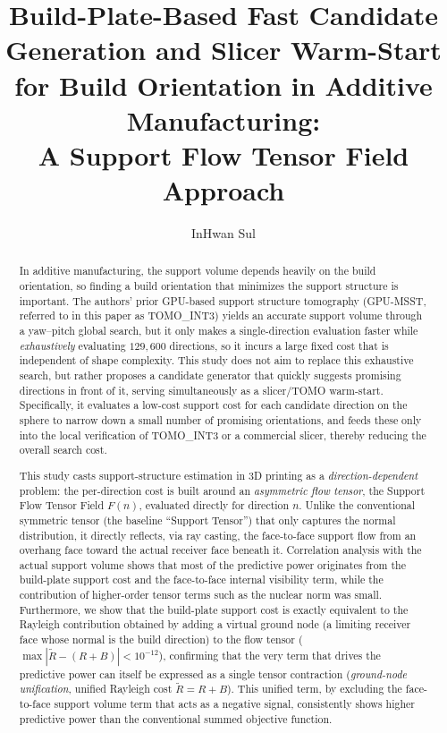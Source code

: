 \documentclass[11pt,a4paper]{article}
\title{Build-Plate-Based Fast Candidate Generation and Slicer Warm-Start for Build Orientation in Additive Manufacturing:\\A Support Flow Tensor Field Approach}
\author{InHwan Sul}
\date{}
\begin{document}
\maketitle

\begin{abstract}
In additive manufacturing, the support volume depends heavily on the build orientation, so finding a build orientation that minimizes the support structure is important.
The authors' prior GPU-based support structure tomography (GPU-MSST, referred to in this paper as TOMO\_INT3)
yields an accurate support volume through a yaw--pitch global search, but it only makes a single-direction evaluation faster while
\emph{exhaustively} evaluating $129{,}600$ directions, so it incurs a large fixed cost that is independent of shape complexity.
This study does not aim to replace this exhaustive search, but rather proposes a candidate generator that quickly suggests promising directions in front of it,
serving simultaneously as a slicer/TOMO warm-start.
Specifically, it evaluates a low-cost support cost for each candidate direction on the sphere to narrow down a small number of promising orientations,
and feeds these only into the local verification of TOMO\_INT3 or a commercial slicer, thereby reducing the overall search cost.

This study casts support-structure estimation in 3D printing as a \emph{direction-dependent} problem: the per-direction cost
is built around an \emph{asymmetric flow tensor}, the Support Flow Tensor Field $F(n)$, evaluated directly for direction $n$.
Unlike the conventional symmetric tensor (the baseline ``Support Tensor'') that only captures the normal distribution,
it directly reflects, via ray casting, the face-to-face support flow from an overhang face toward the actual receiver face beneath it.
Correlation analysis with the actual support volume shows that most of the predictive power originates from the build-plate support cost and the face-to-face internal visibility term,
while the contribution of higher-order tensor terms such as the nuclear norm was small.
Furthermore, we show that the build-plate support cost is exactly equivalent to the Rayleigh contribution obtained by adding a virtual ground node
(a limiting receiver face whose normal is the build direction) to the flow tensor ($\max|\tilde R-(R+B)|<10^{-12}$),
confirming that the very term that drives the predictive power can itself be expressed as a single tensor contraction
(\emph{ground-node unification}, unified Rayleigh cost $\tilde R=R+B$).
This unified term, by excluding the face-to-face support volume term that acts as a negative signal, consistently shows higher predictive power than the conventional summed objective function.


\end{abstract}
\end{document}
